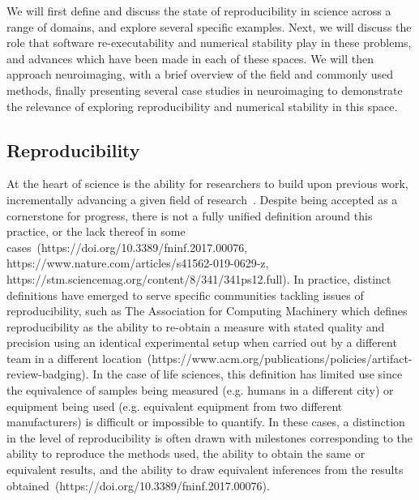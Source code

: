 We will first define and discuss the state of reproducibility in science across a range of domains, and explore several
specific examples. Next, we will discuss the role that software re-executability and numerical stability play in these
problems, and advances which have been made in each of these spaces. We will then approach neuroimaging, with a brief
overview of the field and commonly used methods, finally presenting several case studies in neuroimaging to demonstrate
the relevance of exploring reproducibility and numerical stability in this space.

\subsection{Reproducibility}
At the heart of science is the ability for researchers to build upon previous work, incrementally advancing a given
field of research~\tocite {}. Despite being accepted as a cornerstone for progress, there is not a fully unified definition around
this practice, or the lack thereof in some cases~\tocite (https://doi.org/10.3389/fninf.2017.00076, https://www.nature.com/articles/s41562-019-0629-z, https://stm.sciencemag.org/content/8/341/341ps12.full).
In practice, distinct definitions have emerged to serve specific communities tackling issues of reproducibility, such
as The Association for Computing Machinery which defines reproducibility as the ability to re-obtain a measure with
stated quality and precision using an identical experimental setup when carried out by a different team in a different
location~\tocite(https://www.acm.org/publications/policies/artifact-review-badging). In the case of life sciences,
this definition has limited use since the equivalence of samples being measured (e.g. humans in a different city) or
equipment being used (e.g. equivalent equipment from two different manufacturers) is difficult or impossible to
quantify. In these cases, a distinction in the level of reproducibility is often drawn with milestones corresponding to
the ability to reproduce the methods used, the ability to obtain the same or equivalent results, and the ability to
draw equivalent inferences from the results obtained~\tocite (https://doi.org/10.3389/fninf.2017.00076).

